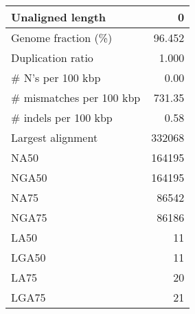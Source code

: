\documentclass[12pt,a4paper]{article}
\begin{document}
\begin{table}[ht]
\begin{center}
\begin{tabular}{|l*{1}{|r}|}
Unaligned length & 0 \\ \hline
Genome fraction (\%) & 96.452 \\ \hline
Duplication ratio & 1.000 \\ \hline
\# N's per 100 kbp & 0.00 \\ \hline
\# mismatches per 100 kbp & 731.35 \\ \hline
\# indels per 100 kbp & 0.58 \\ \hline
Largest alignment & 332068 \\ \hline
NA50 & 164195 \\ \hline
NGA50 & 164195 \\ \hline
NA75 & 86542 \\ \hline
NGA75 & 86186 \\ \hline
LA50 & 11 \\ \hline
LGA50 & 11 \\ \hline
LA75 & 20 \\ \hline
LGA75 & 21 \\ \hline
\end{tabular}
\end{center}
\end{table}
\end{document}

